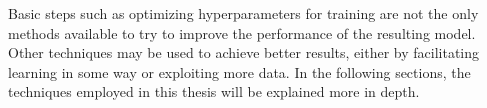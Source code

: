 Basic steps such as optimizing hyperparameters for training are not the only methods available to try to improve the performance of the resulting model. 
Other techniques may be used to achieve better results, either by facilitating learning in some way or exploiting more data. 
In the following sections, the techniques employed in this thesis will be explained more in depth.